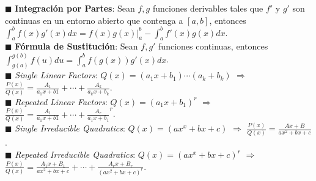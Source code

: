 \documentclass[11pt,a4paper]{article}
\begin{document}
$\blacksquare$ \textbf{Integraci\'on por Partes}: Sean $f,g$ funciones derivables tales que $f'$ y $g'$ son continuas en un entorno abierto que contenga a $[a,b]$, entonces $\int_a^bf(x)g'(x)dx = f(x)g(x)|^b_a - \int_a^bf'(x)g(x)dx$.\\
$\blacksquare$ \textbf{F\'ormula de Sustituci\'on}: Sean $f, g'$ funciones continuas, entonces $\int_{g(a)}^{g(b)}f(u)du = \int_a^b f(g(x))g'(x)dx$.\\
$\blacksquare$ \textit{Single Linear Factors}: $Q(x) = (a_1x+b_1)\cdots(a_k+b_k)$ $\Rightarrow$ $\frac{P(x)}{Q(x)} = \frac{A_1}{a_1x+b1}+\cdots+\frac{A_k}{a_kx+b_k}$.\\
$\blacksquare$ \textit{Repeated Linear Factors}: $Q(x) = (a_1x+b_1)^r$ $\Rightarrow$ $\frac{P(x)}{Q(x)} = \frac{A_1}{a_1x+b1}+\cdots+\frac{A_r}{a_1x+b_1}^r$.\\
$\blacksquare$ \textit{Single Irreducible Quadratics}: $Q(x) = (ax^x+bx+c)$ $\Rightarrow$ $\frac{P(x)}{Q(x)} = \frac{Ax+B}{ax^2+bx+c}$.\\
$\blacksquare$ \textit{Repeated Irreducible Quadratics}: $Q(x) = (ax^x+bx+c)^r$ $\Rightarrow$ $\frac{P(x)}{Q(x)} = \frac{A_1x+B_1}{ax^2+bx+c} + \cdots + \frac{A_rx+B_r}{(ax^2+bx+c)^r}$.\\

\newpage
\end{document}
